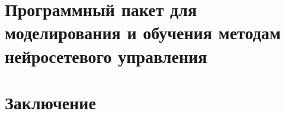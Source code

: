 \documentclass[12pt]{rusthesis}
\begin{document}
\chapter{Программный пакет для моделирования и обучения методам нейросетевого управления}



\chapter*{Заключение}
\end{document}
